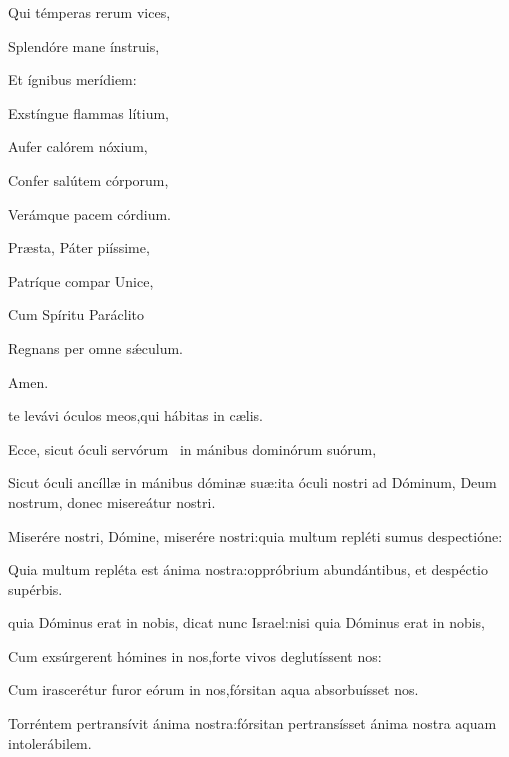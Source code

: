 \begin{multicols}{2}
\Hymne{}

Qui témperas rerum vices,

Splendóre mane ínstruis,

Et ígnibus merídiem\thinspace:

\vspace{0.3cm}

Exstíngue flammas lítium,

Aufer calórem nóxium,

Confer salútem córporum,

Verámque pacem córdium.

\vspace{0.3cm}

Præsta, Páter piíssime,

Patríque compar Unice,

Cum Spíritu Paráclito

Regnans per omne sǽculum.

\begin{flushright}
Amen.
\end{flushright}




\Normal

 te levávi óculos meos,\GreStarNbsp qui hábitas in cælis.

Ecce, sicut óculi servórum \GreStar\ in mánibus dominórum suórum,

Sicut óculi ancíllæ in mánibus dóminæ suæ\thinspace:\GreStarNbsp ita óculi nostri ad Dóminum, Deum nostrum, donec misereátur nostri.

Miserére nostri, Dómine, miserére nostri\thinspace:\GreStarNbsp quia multum repléti sumus despectióne\thinspace:

Quia multum repléta est ánima nostra\thinspace:\GreStarNbsp oppróbrium abundántibus, et despéctio supérbis.



\Normal

 quia Dóminus erat in nobis, dicat nunc Israel\thinspace:\GreStarNbsp nisi quia Dóminus erat in nobis,

Cum exsúrgerent hómines in nos,\GreStarNbsp forte vivos deglutíssent nos\thinspace:

Cum irascerétur furor eórum in nos,\GreStarNbsp fórsitan aqua absorbuísset nos.

Torréntem pertransívit ánima nostra\thinspace:\GreStarNbsp fórsitan pertransísset ánima nostra aquam intolerábilem.


\end{multicols}
